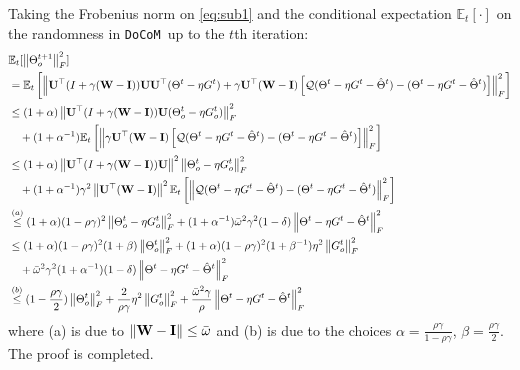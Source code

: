 \documentclass[10pt]{article} %
\theoremstyle{plain}
\theoremstyle{definition}
\theoremstyle{remark}
\newcommand{\aname}{{\tt DoCoM}}
\newcommand{\bw}{\bar{\omega}}
\newcommand{\norm}[1]{\left\| #1 \right\|}
\newcommand{\nl}{\nonumber\\}
\newcommand{\W}{{\bf W}}
\newcommand{\U}{{\bf U}}
\newcommand{\I}{{\bf I}}
\begin{document}
Taking the Frobenius norm on \eqref{eq:sub1} and the conditional expectation $\mathbb{E}_t [ \cdot ]$ on the randomness in \aname~up to the $t$th iteration:
\begin{align}
    & \mathbb{E}_t [ \norm{\Theta^{t+1}_o}^2_F ] \\ 
    & = \mathbb{E}_t \left[ \norm{\U^\top(I + \gamma (\W-\I)) \U \U^\top(\Theta^t - \eta G^t) + \gamma \U^\top (\W-\I) \left[ {\cal Q} (\Theta^t - \eta G^t - \hat{\Theta}^t ) - (\Theta^t - \eta G^t - \hat{\Theta}^t)\right]}^2_F \right] \nonumber \\
    &\leq (1+\alpha)\norm{\U^\top(I + \gamma (\W-\I)) \U (\Theta^t_o - \eta G^t_o)}^2_F  \nonumber \\ 
    &\quad + (1+\alpha^{-1}) \mathbb{E}_t \left[ \norm{\gamma \U^\top (\W-\I) \left[ {\cal Q} (\Theta^t - \eta G^t - \hat{\Theta}^t ) - (\Theta^t - \eta G^t - \hat{\Theta}^t)\right]}^2_F  \right]\nonumber \\
    &\leq (1+\alpha) \norm{\U^\top(I + \gamma (\W-\I)) \U}^2 \norm{\Theta^t_o - \eta G^t_o}_F^2  \nonumber \\
    &\quad +  (1+\alpha^{-1})\gamma^2 \norm{\U^\top(\W-\I)}^2 \mathbb{E}_t \left[ \norm{ {\cal Q} (\Theta^t - \eta G^t - \hat{\Theta}^t ) - (\Theta^t - \eta G^t - \hat{\Theta}^t)}^2_F \right] \nonumber  \\
    & \overset{(a)}{\leq} (1+\alpha) (1-\rho\gamma)^2 \norm{\Theta^t_o - \eta G^t_o}_F^2 + (1+\alpha^{-1})\bw^2 \gamma^2 (1-\delta)\norm{\Theta^t - \eta G^t - \hat{\Theta}^t}^2_F  \nonumber \\
    &\leq (1+\alpha)(1-\rho \gamma)^2(1+\beta) \norm{\Theta^t_o}_F^2 + (1+\alpha)(1-\rho \gamma)^2(1+\beta^{-1})\eta^2 \norm{G^t_o}_F^2 \nonumber \\
    & \quad + \bw^2 \gamma^2(1+\alpha^{-1})(1-\delta)\norm{\Theta^t - \eta G^t - \hat{\Theta}^t}^2_F  \nonumber \\
    & \overset{(b)}{\leq} (1-\frac{\rho\gamma}{2}) \norm{\Theta_o^t}_F^2
    + \frac{2}{\rho \gamma} \eta^2 \norm{G_o^t}_F^2 \nonumber
    + \frac{\bw^2 \gamma}{\rho} \norm{\Theta^t - \eta G^t - \hat{\Theta}^t}^2_F \nonumber
    \label{eq:Theta_0_norm_summary}
\end{align}
where (a) is due to $\norm{ \W - \I } \leq \bw$ and (b) is due to the choices $\alpha  = \frac{\rho \gamma}{1-\rho \gamma}$, $\beta = \frac{ \rho \gamma }{2}$.
The proof is completed.
\end{document}

